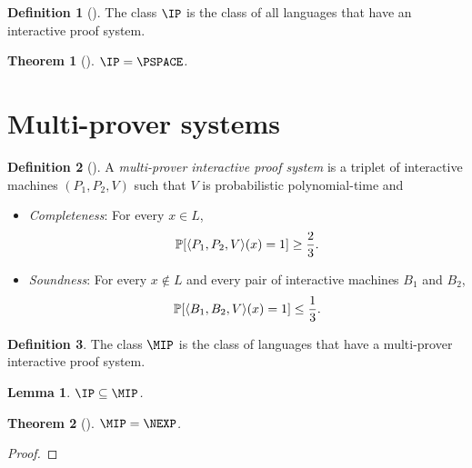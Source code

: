 \documentclass[english]{reedthesis}
\theoremstyle{plain}
\newtheorem{thm}{Theorem}[section]
\newtheorem{lemma}[lemma]{Lemma}
\theoremstyle{definition}
\newtheorem{defn}[defn]{Definition}
\theoremstyle{remark}
\DeclarePairedDelimiter{\ang}{\langle}{\rangle}
\begin{document}
\begin{defn}[{\cite[Def.\ 4.2.5]{Go01}}]\label{def:ip}
  The class $\IP$ is the class of all languages that have an interactive proof
  system.
\end{defn}

\begin{thm}[{\cite{Sha92}}]\label{thm:ip-is-pspace}
  $\IP = \PSPACE$.
\end{thm}

\section{Multi-prover systems}\label{sec:multi-prover}

\begin{defn}[{\cite[Def.\ 4.11.2]{Go01}}]\label{def:mps}
  A \emph{multi-prover interactive proof system} is a triplet of interactive
  machines $(P_{1}, P_{2}, V)$ such that $V$ is probabilistic polynomial-time
  and
  \begin{itemize}
    \item \emph{Completeness}: For every $x \in L$,
          \[
            \mathbb{P}[\ang{P_{1}, P_{2}, V}(x) = 1] \ge \frac{2}{3}.
          \]
    \item \emph{Soundness}: For every $x \notin L$ and every pair of interactive
          machines $B_{1}$ and $B_{2}$,
          \[
            \mathbb{P}[\ang{B_{1}, B_{2}, V}(x) = 1] \le \frac{1}{3}.
          \]
  \end{itemize}
\end{defn}

\begin{defn}\label{def:mip}
  The class $\MIP$ is the class of languages that have a multi-prover
  interactive proof system.
\end{defn}

\begin{lemma}\label{lem:ip-in-mip}
  $\IP \subseteq \MIP$.
\end{lemma}

\begin{thm}[{\cite{BFL90}}]\label{thm:mip-is-nexp}
  $\MIP = \NEXP$.
\end{thm}

\begin{proof}
\end{proof}
\end{document}
